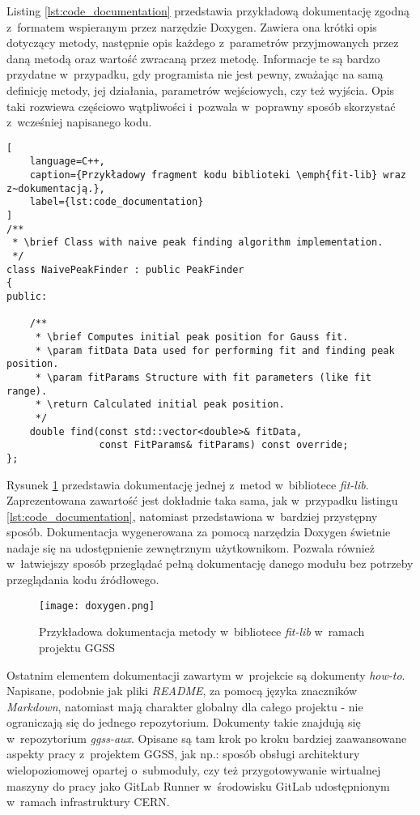 Listing \ref{lst:code_documentation} przedstawia przykładową dokumentację zgodną z~formatem wspieranym przez narzędzie Doxygen. Zawiera ona krótki opis dotyczący metody, następnie opis każdego z~parametrów przyjmowanych przez daną metodą oraz wartość zwracaną przez metodę. Informacje te są bardzo przydatne w~przypadku, gdy programista nie jest pewny, zważając na samą definicję metody, jej działania, parametrów wejściowych, czy też wyjścia. Opis taki rozwiewa częściowo wątpliwości i~pozwala w~poprawny sposób skorzystać z~wcześniej napisanego kodu.

\begin{lstlisting}[
    language=C++,
    caption={Przykładowy fragment kodu biblioteki \emph{fit-lib} wraz z~dokumentacją.},
    label={lst:code_documentation}
]
/**
 * \brief Class with naive peak finding algorithm implementation.
 */
class NaivePeakFinder : public PeakFinder
{
public:

    /**
     * \brief Computes initial peak position for Gauss fit.
     * \param fitData Data used for performing fit and finding peak position.
     * \param fitParams Structure with fit parameters (like fit range).
     * \return Calculated initial peak position.
     */
    double find(const std::vector<double>& fitData,
                const FitParams& fitParams) const override;
};
\end{lstlisting}

Rysunek \ref{fig:doxygen} przedstawia dokumentację jednej z~metod w~bibliotece \emph{fit-lib}. Zaprezentowana zawartość jest dokładnie taka sama, jak w~przypadku listingu \ref{lst:code_documentation}, natomiast przedstawiona w~bardziej przystępny sposób. Dokumentacja wygenerowana za pomocą narzędzia Doxygen świetnie nadaje się na udostępnienie zewnętrznym użytkownikom. Pozwala również w~łatwiejszy sposób przeglądać pełną dokumentację danego modułu bez potrzeby przeglądania kodu źródłowego.

\begin{figure}[H]
    \centering
    \texttt{[image: doxygen.png]}
    \caption{Przykładowa dokumentacja metody w~bibliotece \emph{fit-lib} w~ramach projektu GGSS}
    \label{fig:doxygen}
\end{figure}

Ostatnim elementem dokumentacji zawartym w~projekcie są dokumenty \emph{how-to}. Napisane, podobnie jak pliki \emph{README}, za pomocą języka znaczników \emph{Markdown}, natomiast mają charakter globalny dla całego projektu - nie ograniczają się do jednego repozytorium. Dokumenty takie znajdują się w~repozytorium \emph{ggss-aux}. Opisane są tam krok po kroku bardziej zaawansowane aspekty pracy z~projektem GGSS, jak np.: sposób obsługi architektury wielopoziomowej opartej o~submoduły, czy też przygotowywanie wirtualnej maszyny do pracy jako GitLab Runner w~środowisku GitLab udostępnionym w~ramach infrastruktury CERN.


